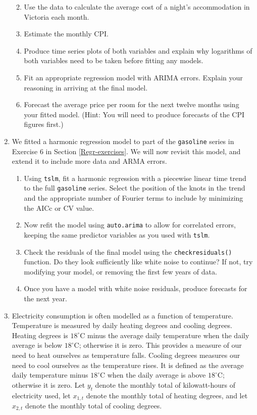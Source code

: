 \documentclass[]{book}
\providecommand{\tightlist}{%
  \setlength{\itemsep}{0pt}\setlength{\parskip}{0pt}}
\begin{document}
\begin{enumerate}
  \begin{enumerate}
  \def\labelenumii{\alph{enumii}.}
  \tightlist
  \item
    Use the data to calculate the average cost of a night's accommodation in Victoria each month.
  \item
    Estimate the monthly CPI.
  \item
    Produce time series plots of both variables and explain why logarithms of both variables need to be taken before fitting any models.
  \item
    Fit an appropriate regression model with ARIMA errors. Explain your reasoning in arriving at the final model.
  \item
    Forecast the average price per room for the next twelve months using your fitted model. (Hint: You will need to produce forecasts of the CPI figures first.)
  \end{enumerate}
\item
  We fitted a harmonic regression model to part of the \texttt{gasoline} series in Exercise 6 in Section \ref{Regr-exercises}. We will now revisit this model, and extend it to include more data and ARMA errors.

  \begin{enumerate}
  \def\labelenumii{\alph{enumii}.}
  \tightlist
  \item
    Using \texttt{tslm}, fit a harmonic regression with a piecewise linear time trend to the full \texttt{gasoline} series. Select the position of the knots in the trend and the appropriate number of Fourier terms to include by minimizing the AICc or CV value.
  \item
    Now refit the model using \texttt{auto.arima} to allow for correlated errors, keeping the same predictor variables as you used with \texttt{tslm}.
  \item
    Check the residuals of the final model using the \texttt{checkresiduals()} function. Do they look sufficiently like white noise to continue? If not, try modifying your model, or removing the first few years of data.
  \item
    Once you have a model with white noise residuals, produce forecasts for the next year.
  \end{enumerate}
\item
  Electricity consumption is often modelled as a function of temperature. Temperature is measured by daily heating degrees and cooling degrees. Heating degrees is \(18^\circ\)C minus the average daily temperature when the daily average is below \(18^\circ\)C; otherwise it is zero. This provides a measure of our need to heat ourselves as temperature falls. Cooling degrees measures our need to cool ourselves as the temperature rises. It is defined as the average daily temperature minus \(18^\circ\)C when the daily average is above \(18^\circ\)C; otherwise it is zero. Let \(y_t\) denote the monthly total of kilowatt-hours of electricity used, let \(x_{1,t}\) denote the monthly total of heating degrees, and let \(x_{2,t}\) denote the monthly total of cooling degrees.


\end{enumerate}
\end{document}
